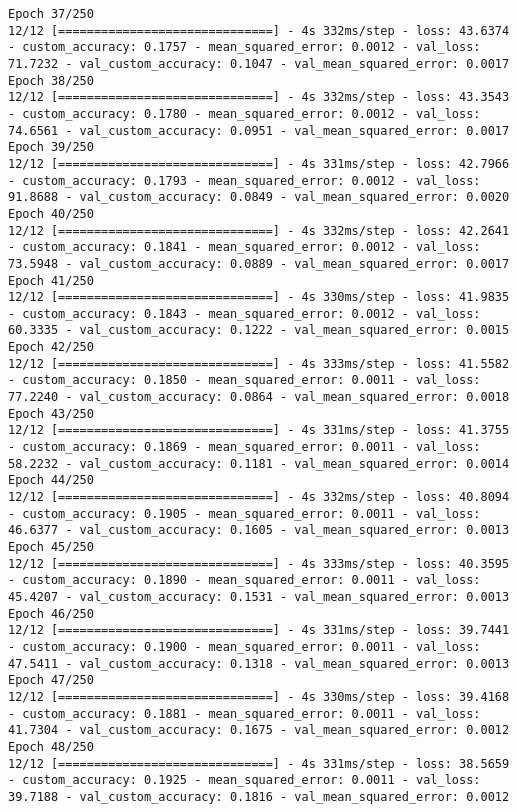 \begin{lstlisting}
Epoch 37/250
12/12 [==============================] - 4s 332ms/step - loss: 43.6374 - custom_accuracy: 0.1757 - mean_squared_error: 0.0012 - val_loss: 71.7232 - val_custom_accuracy: 0.1047 - val_mean_squared_error: 0.0017
Epoch 38/250
12/12 [==============================] - 4s 332ms/step - loss: 43.3543 - custom_accuracy: 0.1780 - mean_squared_error: 0.0012 - val_loss: 74.6561 - val_custom_accuracy: 0.0951 - val_mean_squared_error: 0.0017
Epoch 39/250
12/12 [==============================] - 4s 331ms/step - loss: 42.7966 - custom_accuracy: 0.1793 - mean_squared_error: 0.0012 - val_loss: 91.8688 - val_custom_accuracy: 0.0849 - val_mean_squared_error: 0.0020
Epoch 40/250
12/12 [==============================] - 4s 332ms/step - loss: 42.2641 - custom_accuracy: 0.1841 - mean_squared_error: 0.0012 - val_loss: 73.5948 - val_custom_accuracy: 0.0889 - val_mean_squared_error: 0.0017
Epoch 41/250
12/12 [==============================] - 4s 330ms/step - loss: 41.9835 - custom_accuracy: 0.1843 - mean_squared_error: 0.0012 - val_loss: 60.3335 - val_custom_accuracy: 0.1222 - val_mean_squared_error: 0.0015
Epoch 42/250
12/12 [==============================] - 4s 333ms/step - loss: 41.5582 - custom_accuracy: 0.1850 - mean_squared_error: 0.0011 - val_loss: 77.2240 - val_custom_accuracy: 0.0864 - val_mean_squared_error: 0.0018
Epoch 43/250
12/12 [==============================] - 4s 331ms/step - loss: 41.3755 - custom_accuracy: 0.1869 - mean_squared_error: 0.0011 - val_loss: 58.2232 - val_custom_accuracy: 0.1181 - val_mean_squared_error: 0.0014
Epoch 44/250
12/12 [==============================] - 4s 332ms/step - loss: 40.8094 - custom_accuracy: 0.1905 - mean_squared_error: 0.0011 - val_loss: 46.6377 - val_custom_accuracy: 0.1605 - val_mean_squared_error: 0.0013
Epoch 45/250
12/12 [==============================] - 4s 333ms/step - loss: 40.3595 - custom_accuracy: 0.1890 - mean_squared_error: 0.0011 - val_loss: 45.4207 - val_custom_accuracy: 0.1531 - val_mean_squared_error: 0.0013
Epoch 46/250
12/12 [==============================] - 4s 331ms/step - loss: 39.7441 - custom_accuracy: 0.1900 - mean_squared_error: 0.0011 - val_loss: 47.5411 - val_custom_accuracy: 0.1318 - val_mean_squared_error: 0.0013
Epoch 47/250
12/12 [==============================] - 4s 330ms/step - loss: 39.4168 - custom_accuracy: 0.1881 - mean_squared_error: 0.0011 - val_loss: 41.7304 - val_custom_accuracy: 0.1675 - val_mean_squared_error: 0.0012
Epoch 48/250
12/12 [==============================] - 4s 331ms/step - loss: 38.5659 - custom_accuracy: 0.1925 - mean_squared_error: 0.0011 - val_loss: 39.7188 - val_custom_accuracy: 0.1816 - val_mean_squared_error: 0.0012

\end{lstlisting}
